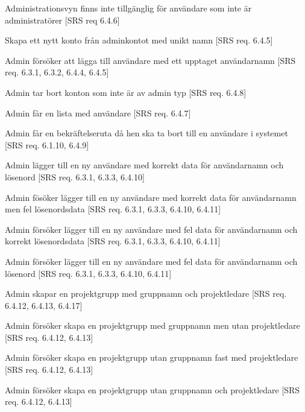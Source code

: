 \documentclass[a4paper]{article}
\begin{document}
\begin{appendices}
\begin{FT}
\item
Administrationsvyn finns inte tillgänglig för användare som inte är administratörer [SRS req 6.4.6]

\item
Skapa ett nytt konto från adminkontot med unikt namn [SRS req. 6.4.5]

\item
Admin försöker att lägga till användare med ett upptaget användarnamn [SRS req. 6.3.1, 6.3.2, 6.4.4, 6.4.5]

\item
Admin tar bort konton som inte är av admin typ [SRS req. 6.4.8]

\item
Admin får en lista med användare [SRS req. 6.4.7]

\item
Admin får en bekräftelseruta då hen ska ta bort till en användare i systemet [SRS req. 6.1.10, 6.4.9]

\item
Admin lägger till en ny användare med korrekt data för användarnamn och lösenord [SRS req. 6.3.1, 6.3.3, 6.4.10]

\item
Admin fösöker lägger till en ny användare med korrekt data för användarnamn men fel lösenordsdata [SRS req. 6.3.1, 6.3.3, 6.4.10, 6.4.11]

\item
Admin försöker lägger till en ny användare med fel data för användarnamn och korrekt lösenordsdata [SRS req. 6.3.1, 6.3.3, 6.4.10, 6.4.11]

\item
Admin försöker lägger till en ny användare med fel data för användarnamn och lösenord [SRS req. 6.3.1, 6.3.3, 6.4.10, 6.4.11]

\item 
Admin skapar en projektgrupp med gruppnamn och projektledare [SRS req. 6.4.12, 6.4.13, 6.4.17]

\item 
Admin försöker skapa en projektgrupp med gruppnamn men utan projektledare [SRS req. 6.4.12, 6.4.13]

\item 
Admin försöker skapa en projektgrupp utan gruppnamn fast med projektledare [SRS req. 6.4.12, 6.4.13]

\item 
Admin försöker skapa en projektgrupp utan gruppnamn och projektledare [SRS req. 6.4.12, 6.4.13]


\end{FT}
\end{appendices}
\end{document}
